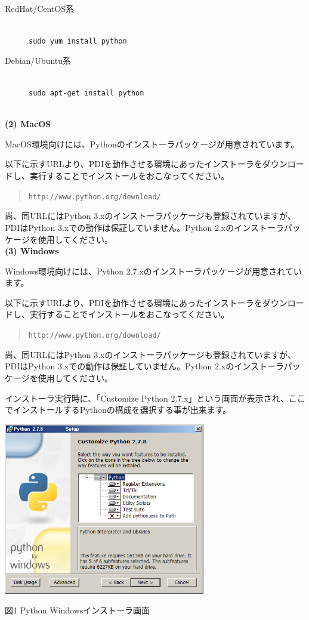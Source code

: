 \documentclass[a4paper,11pt]{jarticle}
\begin{document}
\begin{description}
\item[RedHat/CentOS系] {\ } \\
{\tt sudo yum install python} \\
\item[Debian/Ubuntu系] {\ } \\
{\tt sudo apt-get install python}\\
\end{description}
{\ }\\


\textbf{(2) MacOS}

MacOS環境向けには、Pythonのインストーラパッケージが用意されています。

以下に示すURLより、PDIを動作させる環境にあったインストーラをダウンロードし、実行することでインストールをおこなってください。
\begin{quote}
{\tt http://www.python.org/download/}
\end{quote}
尚、同URLにはPython 3.xのインストーラパッケージも登録されていますが、PDIはPython
3.xでの動作は保証していません。Python 2.xのインストーラパッケージを使用してください。
{\ }\\


\textbf{(3) Windows}

Windows環境向けには、Python 2.7.xのインストーラパッケージが用意されています。

以下に示すURLより、PDIを動作させる環境にあったインストーラをダウンロードし、実行することでインストールをおこなってください。
\begin{quote}
{\tt http://www.python.org/download/}
\end{quote}
尚、同URLにはPython 3.xのインストーラパッケージも登録されていますが、PDIはPython
3.xでの動作は保証していません。Python 2.xのインストーラパッケージを使用してください。

インストーラ実行時に、「Customize Python 2.7.x」という画面が表示され、ここでインストールするPythonの構成を選択する事が出来ます。

\begin{center}
\includegraphics[width=250pt, bb=0 0 499 425]{figs/fig000.png}

図1 Python Windowsインストーラ画面
\end{center}
\end{document}

